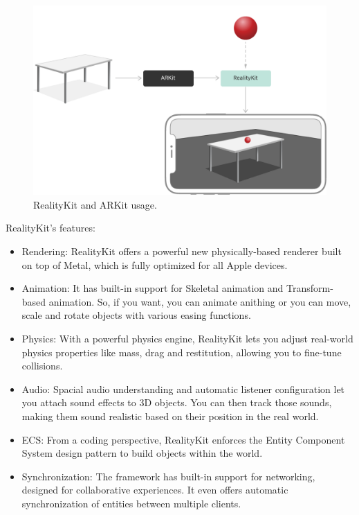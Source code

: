 \documentclass[a4paper,oneside]{article}
\begin{document}
\begin{figure}[!ht]
  \centering
  \includegraphics[width=150mm]{../images/realitykit.png}
  \caption{RealityKit and ARKit usage.}
  \label{fig:arKitRealityKit}
\end{figure}

RealityKit’s features:
\begin{itemize}
  \item Rendering: RealityKit offers a powerful new physically-based renderer built on top of Metal, which is fully optimized for all Apple devices.

  \item Animation: It has built-in support for Skeletal animation and Transform-based animation. So, if you want, you can animate anithing or you can move, scale and rotate objects with various easing functions.

  \item Physics: With a powerful physics engine, RealityKit lets you adjust real-world physics properties like mass, drag and restitution, allowing you to fine-tune collisions.

  \item Audio: Spacial audio understanding and automatic listener configuration let you attach sound effects to 3D objects. You can then track those sounds, making them sound realistic based on their position in the real world.

  \item ECS: From a coding perspective, RealityKit enforces the Entity Component System design pattern to build objects within the world.

  \item Synchronization: The framework has built-in support for networking, designed for collaborative experiences. It even offers automatic synchronization of entities between multiple clients.
\end{itemize}
\end{document}
